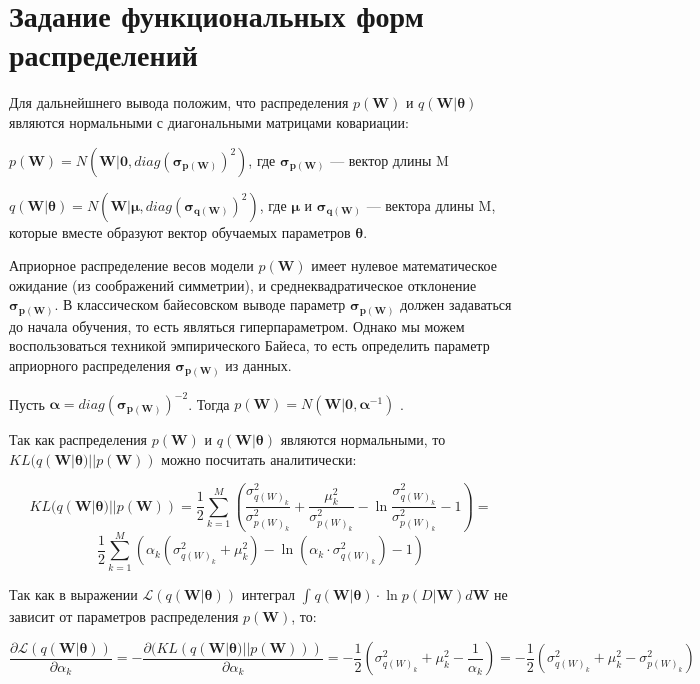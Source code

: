 \documentclass{article}
\begin{document}
\section{Задание функциональных форм распределений}
Для дальнейшнего вывода положим, что распределения $p(\mathbf{W})$ и $q(\mathbf{W} | \pmb{\theta})$ являются нормальными с диагональными матрицами ковариации:

$
p(\mathbf{W}) =
N(\mathbf{W} | \mathbf{0}, diag(\pmb{\sigma_{p(\mathbf{W})}})^{2})$,
где $\pmb{\sigma_{p(\mathbf{W})}}$ — вектор длины M

$q(\mathbf{W} | \pmb{\theta}) = N(\mathbf{W} | \pmb{\mu}, diag(\pmb{\sigma_{q(\mathbf{W})}})^{2})$, где $\pmb{\mu}$ и $\pmb{\sigma_{q(\mathbf{W})}}$ — вектора длины M, которые вместе образуют вектор обучаемых параметров $\pmb{\theta}$.

Априорное распределение весов модели $p(\mathbf{W})$ имеет нулевое математическое ожидание (из соображений симметрии), и среднеквадратическое отклонение $\pmb{\sigma_{p(\mathbf{W})}}$. В классическом байесовском выводе параметр $\pmb{\sigma_{p(\mathbf{W})}}$ должен задаваться до начала обучения, то есть являться гиперпараметром. Однако мы можем воспользоваться техникой эмпирического Байеса, то есть определить параметр  априорного распределения $\pmb{\sigma_{p(\mathbf{W})}}$ из данных.

Пусть $\pmb{\alpha} = diag(\pmb{\sigma_{p(\mathbf{W})}})^{-2}$. Тогда
$
p(\mathbf{W}) =
N(\mathbf{W} | \mathbf{0}, \pmb{\alpha}^{-1})$
.

Так как распределения $p(\mathbf{W})$ и $q(\mathbf{W} | \pmb{\theta})$ являются нормальными, то $KL(q(\mathbf{W} | \pmb{\theta}) || p(\mathbf{W}))$ можно посчитать аналитически:

\[
KL(q(\mathbf{W} | \pmb{\theta}) || p(\mathbf{W})) =
\dfrac{1}{2}\sum_{k=1}^{M}(\dfrac{\sigma_{{q(W)_{k}}}^2}{\sigma_{{p(W)_{k}}}^2} + \dfrac{\mu_{k}^2}{\sigma_{{p(W)_{k}}}^2} - \ln{\dfrac{\sigma_{{q(W)_{k}}}^2}{\sigma_{{p(W)_{k}}}^2}} - 1) =
\]\[
\dfrac{1}{2}\sum_{k=1}^{M}(\alpha_k (\sigma_{{q(W)_{k}}}^2 + \mu_{k}^2) - \ln{(\alpha_k \cdot \sigma_{{q(W)_{k}}}^2)} - 1)
\]

Так как в выражении
$\mathcal{L}(q(\mathbf{W} | \pmb{\theta}))$
интеграл
$\int_{}{} q(\mathbf{W} | \pmb{\theta}) \cdot \ln{p(D | \mathbf{W})} d\mathbf{W}$
не зависит от параметров распределения $p(\mathbf{W})$, то:

\[
\dfrac{\partial \mathcal{L}(q(\mathbf{W} | \pmb{\theta}))}{\partial {\alpha_k}} =
- \dfrac{\partial (KL(q(\mathbf{W} | \pmb{\theta}) || p(\mathbf{W})))}{\partial {\alpha_k}} =
-\dfrac{1}{2}(\sigma_{{q(W)_{k}}}^2 + \mu_{k}^2 - \dfrac{1}{\alpha_k}) =
-\dfrac{1}{2}(\sigma_{{q(W)_{k}}}^2 + \mu_{k}^2 - \sigma_{{p(W)_{k}}}^2)
\]
\end{document}

